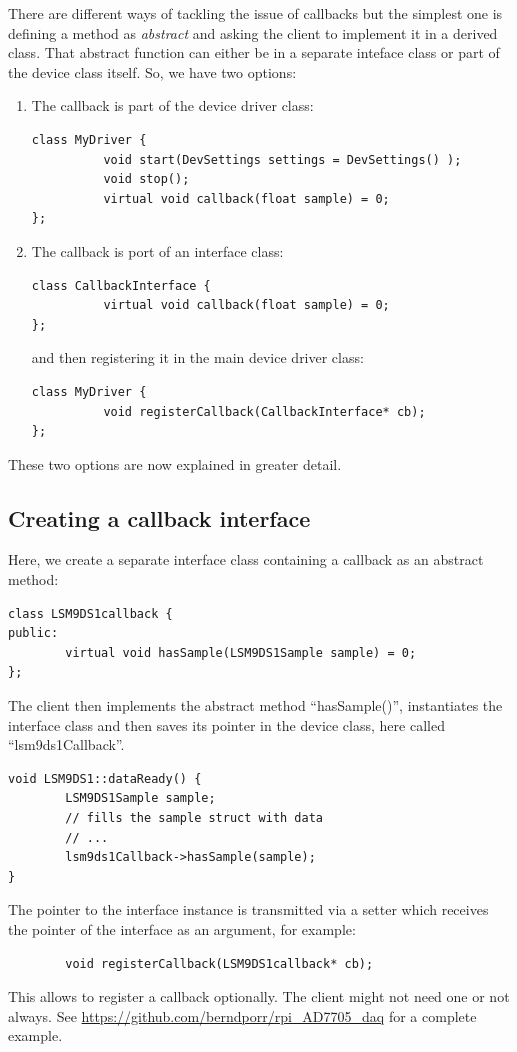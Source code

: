 \documentclass[12pt]{report}
\begin{document}
There are different ways of tackling the issue of callbacks but the
simplest one is defining a method as \textsl{abstract} and asking the
client to implement it in a derived class. That abstract function can
either be in a separate inteface class or part of the device class
itself. So, we have two options:
\begin{enumerate}
\item The callback is part of the device driver class:
\begin{verbatim}
class MyDriver {
          void start(DevSettings settings = DevSettings() );
          void stop();
          virtual void callback(float sample) = 0;
};
\end{verbatim}
\item The callback is port of an interface class:
\begin{verbatim}
class CallbackInterface {
          virtual void callback(float sample) = 0;
};
\end{verbatim}
and then registering it in the main device driver class:
\begin{verbatim}
class MyDriver {
          void registerCallback(CallbackInterface* cb);
};
\end{verbatim}
\end{enumerate}
These two options are now explained in greater detail.


\subsection{Creating a callback interface}
Here, we create a separate interface class containing a callback
as an abstract method:
\begin{verbatim}
class LSM9DS1callback {
public:
        virtual void hasSample(LSM9DS1Sample sample) = 0;
};
\end{verbatim}

The client then implements the abstract method ``hasSample()'', instantiates
the interface class and then saves its pointer in the device class, here called ``lsm9ds1Callback''.
\begin{verbatim}
void LSM9DS1::dataReady() {
        LSM9DS1Sample sample;
        // fills the sample struct with data
        // ...
        lsm9ds1Callback->hasSample(sample);
}
\end{verbatim}
The pointer to the interface instance is transmitted via a setter which
receives the pointer of the interface as an argument, for example:
\begin{verbatim}
        void registerCallback(LSM9DS1callback* cb);
\end{verbatim}
This allows to register a callback optionally. The client might not need
one or not always.
See
\url{https://github.com/berndporr/rpi_AD7705_daq}
for a complete example.
\end{document}
